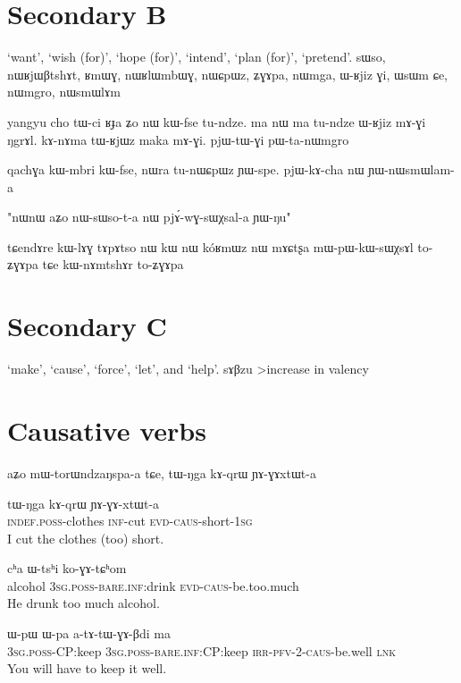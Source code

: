 \documentclass[oldfontcommands,oneside,a4paper,11pt]{article}
\newcommand{\ipa}[1]{{\phon #1}} %
\begin{document}
 
  \section{Secondary B} 
 ‘want’, ‘wish (for)’, ‘hope (for)’, ‘intend’, ‘plan (for)’, ‘pretend’.
sɯso, nɯʁjɯβtshɤt, ʁmɯɣ, nɯʁlɯmbɯɣ, nɯɕpɯz, ʑɣɤpa, nɯmga, ɯ-ʁjiz ɣi, ɯsɯm ɕe, nɯmgro, nɯsmɯlɤm

yangyu cho tɯ-ci ʁɟa ʑo nɯ kɯ-fse tu-ndze.
ma nɯ ma tu-ndze ɯ-ʁjiz mɤ-ɣi ŋgrɤl.
kɤ-nɤma tɯ-ʁjɯz maka mɤ-ɣi.
pjɯ-tɯ-ɣi pɯ-ta-nɯmgro

qachɣa kɯ-mbri kɯ-fse, nɯra tu-nɯɕpɯz ɲɯ-spe. 
pjɯ-kɤ-cha nɯ ɲɯ-nɯsmɯlam-a


"nɯnɯ aʑo nɯ-sɯso-t-a nɯ pjɤ́-wɣ-sɯχsal-a ɲɯ-ŋu" 


tɕendɤre kɯ-lɤɣ tɤpɤtso nɯ kɯ nɯ kóʁmɯz nɯ mɤɕtʂa mɯ-pɯ-kɯ-sɯχsɤl to-ʑɣɤpa tɕe kɯ-nɤmtshɤr to-ʑɣɤpa
  \section{Secondary C} 
‘make’, ‘cause’, ‘force’, ‘let’, and ‘help’.
sɤβzu
>increase in valency
\section{Causative verbs}
aʑo mɯ-torɯndzaŋspa-a tɕe, tɯ-ŋga kɤ-qrɯ ɲɤ-ɣɤxtɯt-a



 \begin{exe}
\ex \label{ex:GAxtWt}
\gll
\ipa{tɯ-ŋga}  	\ipa{kɤ-qrɯ}  	\ipa{ɲɤ-ɣɤ-xtɯt-a}  \\
\textsc{indef.poss}-clothes \textsc{inf}-cut \textsc{evd-caus}-short-\textsc{1sg}\\
 \glt I cut the clothes (too) short.
\end{exe}

 \begin{exe}
\ex \label{ex:koGAtChom}
\gll
\ipa{cʰa} \ipa{ɯ-tsʰi} \ipa{ko-ɣɤ-tɕʰom} \\
alcohol \textsc{3sg.poss}-\textsc{bare.inf}:drink \textsc{evd-caus}-be.too.much \\
\glt He drunk too much alcohol.
\end{exe}
 \begin{exe}
\ex \label{ex:atAtWGABdi}
\gll
\ipa{ɯ-pɯ}  	\ipa{ɯ-pa}  	\ipa{a-tɤ-tɯ-ɣɤ-βdi}  	\ipa{ma}  \\
\textsc{3sg.poss}-CP:keep \textsc{3sg.poss}-\textsc{bare.inf}:CP:keep \textsc{irr-pfv-2-caus}-be.well \textsc{lnk} \\
\glt You will have to keep it well.
\end{exe}
\end{document}
